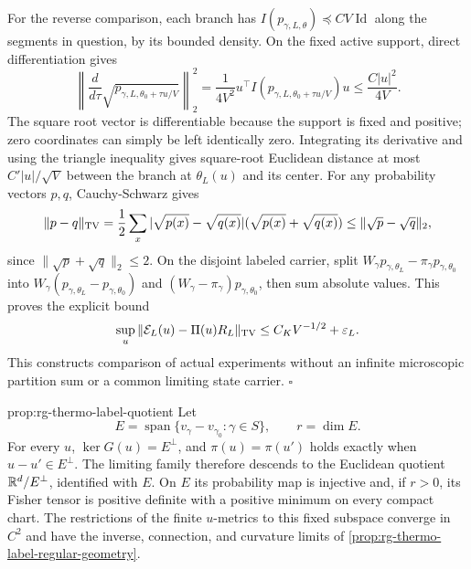 For the reverse comparison, each branch has
$I(p_{\gamma,L,\theta})\preceq CV\operatorname{Id}$ along the
segments in question, by its bounded density. On the fixed active
support, direct differentiation gives
\begin{equation}
 \left\|\frac{d}{d\tau}
        \sqrt{p_{\gamma,L,\theta_0+\tau u/V}}\right\|_2^2
 =\frac1{4V^2}u^\top
       I(p_{\gamma,L,\theta_0+\tau u/V})u
 \leq\frac{C|u|^2}{4V}.
 \label{eq:rg-thermo-label-square-root-bound}
\end{equation}
The square root vector is differentiable because the support is fixed
and positive; zero coordinates can simply be left identically zero.
Integrating its derivative and using the triangle inequality gives
square-root Euclidean distance at most $C'|u|/\sqrt V$ between the
branch at $\theta_L(u)$ and its center. For any probability vectors
$p,q$, Cauchy-Schwarz gives
\begin{equation}
 \|p-q\|_{\rm TV}
 =\frac12\sum_x|\sqrt{p(x)}-\sqrt{q(x)}|
                      (\sqrt{p(x)}+\sqrt{q(x)})
 \leq\|\sqrt p-\sqrt q\|_2,
 \label{eq:rg-thermo-label-tv-square-root}
\end{equation}
since $\|\sqrt p+\sqrt q\|_2\leq2$. On the disjoint labeled carrier,
split $W_\gamma p_{\gamma,\theta_L}-\pi_\gamma p_{\gamma,\theta_0}$
into $W_\gamma(p_{\gamma,\theta_L}-p_{\gamma,\theta_0})$
and $(W_\gamma-\pi_\gamma)p_{\gamma,\theta_0}$, then sum absolute
values. This proves the explicit bound
\begin{equation}
 \sup_u\|\mathcal E_L(u)-\Pi(u)R_L\|_{\rm TV}
 \leq C_KV^{-1/2}+\varepsilon_L.
 \label{eq:rg-thermo-label-experiment-error}
\end{equation}
This constructs comparison of actual experiments without an infinite
microscopic partition sum or a common limiting state carrier.
$\square$

{prop:rg-thermo-label-quotient}
Let
\begin{equation}
 E=\operatorname{span}\{v_\gamma-v_{\gamma_0}:\gamma\in S\},
 \qquad r=\dim E.
 \label{eq:rg-thermo-label-slope-space}
\end{equation}
For every $u$, $\ker G(u)=E^\perp$, and
$\pi(u)=\pi(u')$ holds exactly when $u-u'\in E^\perp$.
The limiting family therefore descends to the Euclidean quotient
$\mathbb R^d/E^\perp$, identified with $E$. On $E$ its probability map is
injective and, if $r>0$, its Fisher tensor is positive definite with a
positive minimum on every compact chart. The restrictions of the
finite $u$-metrics to this fixed subspace converge in $C^2$ and have
the inverse, connection, and curvature limits of
\cref{prop:rg-thermo-label-regular-geometry}.\thermoestablishedstatus


